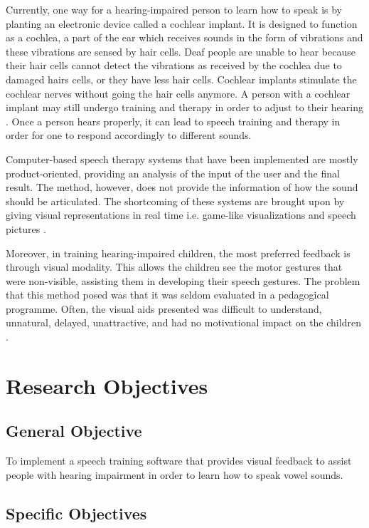 Currently, one way for a hearing-impaired person to learn how to speak is by planting an electronic device called a cochlear implant. It is designed to function as a cochlea, a part of the ear which receives sounds in the form of vibrations and these vibrations are sensed by hair cells. Deaf people are unable to hear because their hair cells cannot detect the vibrations as received by the cochlea due to damaged hairs cells, or they have less hair cells. Cochlear implants stimulate the cochlear nerves without going the hair cells anymore. A person with a cochlear implant may still undergo training and therapy in order to adjust to their hearing \cite{blume:2009:AE}. Once a person hears properly, it can lead to speech training and therapy in order for one to respond accordingly to different sounds.
					
Computer-based speech therapy systems that have been implemented are mostly product-oriented, providing an analysis of the input of the user and the final result. The method, however, does not provide the information of how the sound should be articulated. The shortcoming of these systems are brought upon by giving visual representations in real time i.e. game-like visualizations and speech pictures \cite{oster:2006:cbs}.
									
Moreover, in training hearing-impaired children, the most preferred feedback is through visual modality. This allows the children see the motor gestures that were non-visible, assisting them in developing their speech gestures. The problem that this method posed was that it was seldom evaluated in a pedagogical programme. Often, the visual aids presented was difficult to understand, unnatural, delayed, unattractive, and had no motivational impact on the children \cite{oster:2006:cbs}.
				
\section{Research Objectives}
\label{sec:researchobjectives}

\subsection{General Objective}
\label{sec:generalobjective}

To implement a speech training software that provides visual feedback to assist people with hearing impairment in order to learn how to speak vowel sounds.

\subsection{Specific Objectives}
\label{sec:specificobjectives}


